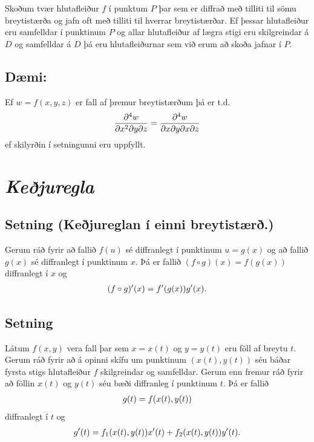 \documentclass[a4paper,10pt,icelandic]{sphinxmanual}
\begin{document}
Skoðum tvær hlutafleiður \(f\) í punktum \(P\) þar sem er
diffrað með tilliti til sömu breytistærða og jafn oft með tilliti til
hverrar breytistærðar. Ef þessar hlutafleiður eru samfelldar í punktinum
\(P\) og allar hlutafleiður af lægra stigi eru skilgreindar á
\(D\) og samfelldar á \(D\) þá eru hlutafleiðurnar sem við erum
að skoða jafnar í \(P\).


\subsection{Dæmi:}
\label{Kafli2:daemi}
Ef \(w = f(x,y,z)\) er fall af þremur breytistærðum þá er t.d.
\begin{gather}
\begin{split}\displaystyle \frac{\partial^4 w}{\partial x^2\partial y \partial z} = \frac{\partial^4 w}{\partial x \partial y \partial x \partial z}\end{split}\notag
\end{gather}
ef skilyrðin í setningunni eru uppfyllt.


\section{\textit{Keðjuregla}}
\label{Kafli2:id16}\label{Kafli2:index-11}

\subsection{Setning (Keðjureglan í einni breytistærð.)}
\label{Kafli2:index-12}\label{Kafli2:setning-kejureglan-i-einni-breytistaer}
Gerum ráð fyrir að fallið \(f(u)\) sé diffranlegt í punktinum
\(u=g(x)\) og að fallið \(g(x)\) sé diffranlegt í punktinum
\(x\). Þá er fallið \((f\circ g)(x)=f(g(x))\) diffranlegt í
\(x\) og
\begin{gather}
\begin{split}\displaystyle (f\circ g)'(x)=f'(g(x))g'(x).\end{split}\notag
\end{gather}

\subsection{Setning}
\label{Kafli2:id17}
Látum \(f(x,y)\) vera fall þar sem \(x=x(t)\) og \(y=y(t)\)
eru föll af breytu \(t\). Gerum ráð fyrir að á opinni skífu um
punktinum \((x(t),y(t))\) séu báðar fyrsta stigs hlutafleiður
\(f\) skilgreindar og samfelldar. Gerum enn fremur ráð fyrir að
föllin \(x(t)\) og \(y(t)\) séu bæði diffranleg í punktinum
\(t\). Þá er fallið
\begin{gather}
\begin{split}\displaystyle g(t)=f(x(t),y(t))\end{split}\notag
\end{gather}
diffranlegt í \(t\) og
\begin{gather}
\begin{split}\displaystyle g'(t)=f_1(x(t),y(t))x'(t)+f_2(x(t),y(t))y'(t).\end{split}\notag
\end{gather}
\end{document}
